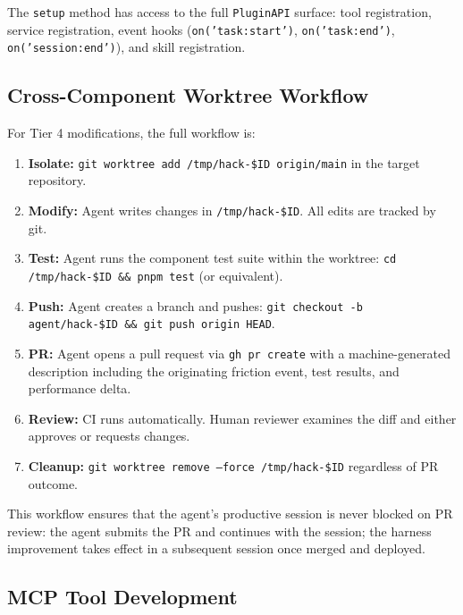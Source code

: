 \documentclass[11pt]{article}
\begin{document}
The \texttt{setup} method has access to the full \texttt{PluginAPI} surface:
tool registration, service registration, event hooks (\texttt{on('task:start')},
\texttt{on('task:end')}, \texttt{on('session:end')}), and skill registration.

\subsection{Cross-Component Worktree Workflow}
\label{sec:worktree-workflow}

For Tier 4 modifications, the full workflow is:

\begin{enumerate}[leftmargin=1.5em]
    \item \textbf{Isolate:} \texttt{git worktree add /tmp/hack-\$ID origin/main}
          in the target repository.
    \item \textbf{Modify:} Agent writes changes in \texttt{/tmp/hack-\$ID}.
          All edits are tracked by git.
    \item \textbf{Test:} Agent runs the component test suite within the worktree:
          \texttt{cd /tmp/hack-\$ID \&\& pnpm test} (or equivalent).
    \item \textbf{Push:} Agent creates a branch and pushes:
          \texttt{git checkout -b agent/hack-\$ID \&\& git push origin HEAD}.
    \item \textbf{PR:} Agent opens a pull request via \texttt{gh pr create}
          with a machine-generated description including the originating friction
          event, test results, and performance delta.
    \item \textbf{Review:} CI runs automatically. Human reviewer examines the
          diff and either approves or requests changes.
    \item \textbf{Cleanup:} \texttt{git worktree remove --force /tmp/hack-\$ID}
          regardless of PR outcome.
\end{enumerate}

This workflow ensures that the agent's productive session is never blocked on
PR review: the agent submits the PR and continues with the session; the harness
improvement takes effect in a subsequent session once merged and deployed.

\subsection{MCP Tool Development}
\label{sec:mcp-tools}
\end{document}
